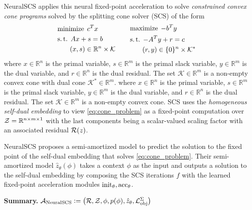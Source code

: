 \documentclass[twoside,11pt]{article}
\begin{document}
NeuralSCS \citep{venkataraman2021neural} applies this
neural fixed-point acceleration to solve
\emph{constrained convex cone programs}
solved by the splitting cone solver (SCS)
\citep{o2016conic}
of the form
\begin{equation}
  \label{eq:cone_problem}
\begin{aligned}[c]
  & \operatorname*{minimize}\; c^{T}x \\
  & \operatorname*{s.t.} \; Ax + s = b \\
  & \qquad (x,s) \in \mathbb{R}^n \times \mathcal{K}
\end{aligned}
\qquad
\begin{aligned}[c]
  & \operatorname*{maximize}\; -b^{T}y \\
  & \operatorname*{s.t.}\; -A^{T}y + r = c \\
  & \qquad (r,y) \in \{0\}^n \times \mathcal{K}^*
\end{aligned}
\end{equation}
where $x \in \mathbb{R}^n$ is the primal variable, $s \in
\mathbb{R}^m$ is the primal slack variable, $y \in \mathbb{R}^m$ is
the dual variable, and $r \in \mathbb{R}^n$ is the dual residual. The
set $\mathcal{K} \in \mathbb{R}^m$ is a non-empty convex cone with
dual cone $\mathcal{K}^* \in \mathbb{R}^m$.
where $x \in \mathbb{R}^n$ is the primal variable, $s \in
\mathbb{R}^m$ is the primal slack variable, $y \in \mathbb{R}^m$ is
the dual variable, and $r \in \mathbb{R}^n$ is the dual residual. The
set $\mathcal{K} \in \mathbb{R}^m$ is a non-empty convex cone.
SCS uses the \emph{homogeneous self-dual embedding} to view
\cref{eq:cone_problem} as a fixed-point computation
over ${\mathcal{Z}}=\mathbb{R}^{n\times m\times 1}$ with the last components being
a scalar-valued scaling factor with an associated
residual ${\mathcal{R}}(z)$.

NeuralSCS proposes a semi-amortized model to predict
the solution to the fixed point of the self-dual embedding
that solves \cref{eq:cone_problem}.
Their semi-amortized model $\hat z_\theta(\phi)$ takes
a context $\phi$ as the input and outputs a solution to the
self-dual embedding by composing the SCS iterations $f$ with
the learned fixed-point acceleration modules
${\rm init}_\theta,{\rm acc}_\theta$.

\textbf{Summary.}
${\mathcal{A}}_{\rm NeuralSCS}\vcentcolon=\left({\mathcal{R}}, {\mathcal{Z}}, \phi, p(\phi), \hat z_\theta, {\mathcal{L}}_{\rm obj}^\Sigma\right)$
\end{document}
